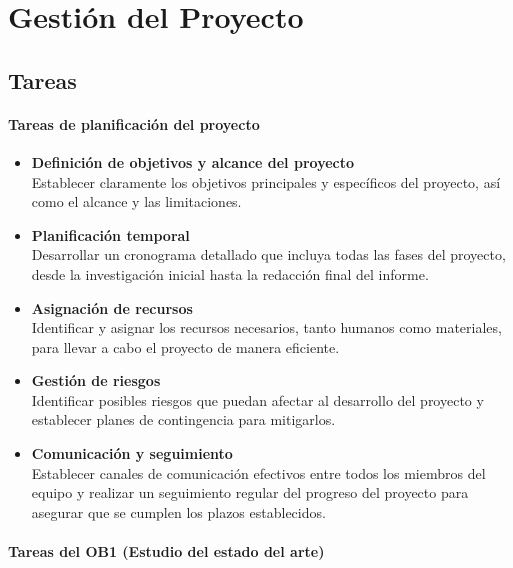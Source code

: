 \chapter{Gestión del Proyecto}\label{cap:gestion_proyecto}

\section{Tareas}\label{sec:tareas}

\subsubsection{Tareas de planificación del proyecto}\label{subsubsec:tareas_organizacion}
\begin{itemize}
      \item \textbf{Definición de objetivos y alcance del proyecto} \\
            Establecer claramente los objetivos principales y específicos del proyecto, así como el alcance y las limitaciones.

      \item \textbf{Planificación temporal} \\
            Desarrollar un cronograma detallado que incluya todas las fases del proyecto, desde la investigación inicial hasta la redacción final del informe.

      \item \textbf{Asignación de recursos} \\
            Identificar y asignar los recursos necesarios, tanto humanos como materiales, para llevar a cabo el proyecto de manera eficiente.

      \item \textbf{Gestión de riesgos} \\
            Identificar posibles riesgos que puedan afectar al desarrollo del proyecto y establecer planes de contingencia para mitigarlos.

      \item \textbf{Comunicación y seguimiento} \\
            Establecer canales de comunicación efectivos entre todos los miembros del equipo y realizar un seguimiento regular del progreso del proyecto para asegurar que se cumplen los plazos establecidos.
\end{itemize}

\subsubsection{Tareas del OB1 (Estudio del estado del arte)}\label{subsubsec:tareas_ob1}

